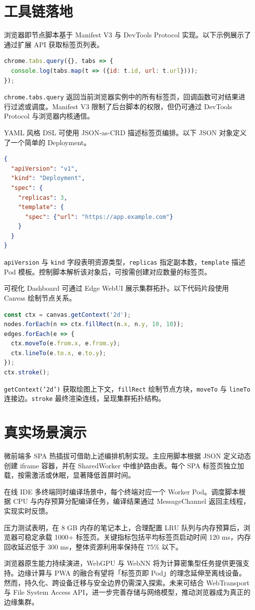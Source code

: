 \chapter{工具链落地}
浏览器即节点脚本基于 Manifest V3 与 DevTools Protocol 实现。以下示例展示了通过扩展 API 获取标签页列表。\par
\begin{lstlisting}[language=js]
chrome.tabs.query({}, tabs => {
  console.log(tabs.map(t => ({id: t.id, url: t.url})));
});
\end{lstlisting}
\texttt{chrome.tabs.query} 返回当前浏览器实例中的所有标签页，回调函数可对结果进行过滤或调度。Manifest V3 限制了后台脚本的权限，但仍可通过 DevTools Protocol 与浏览器内核通信。\par
YAML 风格 DSL 可使用 JSON-as-CRD 描述标签页编排。以下 JSON 对象定义了一个简单的 Deployment。\par
\begin{lstlisting}[language=json]
{
  "apiVersion": "v1",
  "kind": "Deployment",
  "spec": {
    "replicas": 3,
    "template": {
      "spec": {"url": "https://app.example.com"}
    }
  }
}
\end{lstlisting}
\texttt{apiVersion} 与 \texttt{kind} 字段表明资源类型，\texttt{replicas} 指定副本数，\texttt{template} 描述 Pod 模板。控制脚本解析该对象后，可按需创建对应数量的标签页。\par
可视化 Dashboard 可通过 Edge WebUI 展示集群拓扑。以下代码片段使用 Canvas 绘制节点关系。\par
\begin{lstlisting}[language=js]
const ctx = canvas.getContext('2d');
nodes.forEach(n => ctx.fillRect(n.x, n.y, 10, 10));
edges.forEach(e => {
  ctx.moveTo(e.from.x, e.from.y);
  ctx.lineTo(e.to.x, e.to.y);
});
ctx.stroke();
\end{lstlisting}
\texttt{getContext('2d')} 获取绘图上下文，\texttt{fillRect} 绘制节点方块，\texttt{moveTo} 与 \texttt{lineTo} 连接边。\texttt{stroke} 最终渲染连线，呈现集群拓扑结构。\par
\chapter{真实场景演示}
微前端多 SPA 热插拔可借助上述编排机制实现。主应用脚本根据 JSON 定义动态创建 iframe 容器，并在 SharedWorker 中维护路由表。每个 SPA 标签页独立加载，按需激活或休眠，显著降低首屏时间。\par
在线 IDE 多终端同时编译场景中，每个终端对应一个 Worker Pod。调度脚本根据 CPU 与内存预算分配编译任务，编译结果通过 MessageChannel 返回主线程，实现实时反馈。\par
压力测试表明，在 8 GB 内存的笔记本上，合理配置 LRU 队列与内存预算后，浏览器可稳定承载 1000+ 标签页。关键指标包括平均标签页启动时间 120 ms，内存回收延迟低于 300 ms，整体资源利用率保持在 75\%{} 以下。\par
浏览器原生能力持续演进，WebGPU 与 WebNN 将为计算密集型任务提供更强支持。边缘计算与 PWA 的融合有望将「标签页即 Pod」的理念延伸至离线设备。然而，持久化、跨设备迁移与安全边界仍需深入探索。未来可结合 WebTransport 与 File System Access API，进一步完善存储与网络模型，推动浏览器成为真正的边缘集群。\par
